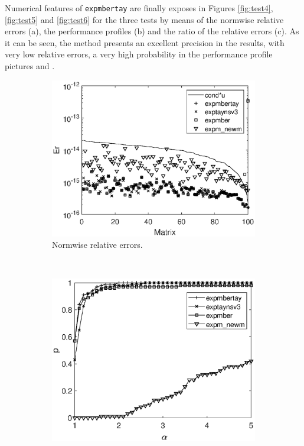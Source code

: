 Numerical features of \texttt{expmbertay} are finally exposes in Figures \ref{fig:test4}, \ref{fig:test5} and \ref{fig:test6} for the three tests by means of the normwise relative errors (a), the performance profiles (b) and the ratio of the relative errors (c). As it can be seen, the method presents an excellent precision in the results, with very low relative errors, a very high probability in the performance profile pictures and .
\begin{figure}[t]
\centering
\begin{subfigure}[b]{0.48\textwidth}
\includegraphics[scale=0.4]{Figures/normwise_exp_diag_hadamard_complex_n128_nd256_expmbertay.eps}
\caption{\footnotesize Normwise relative errors.} \label{fig:test4_a} \vspace{12pt}
\end{subfigure} \ \
\begin{subfigure}[b]{0.48\textwidth}
\includegraphics[scale=0.4]{Figures/nprofile_exp_diag_hadamard_complex_n128_nd256_expmbertay.eps}

\end{subfigure}
\end{figure}
